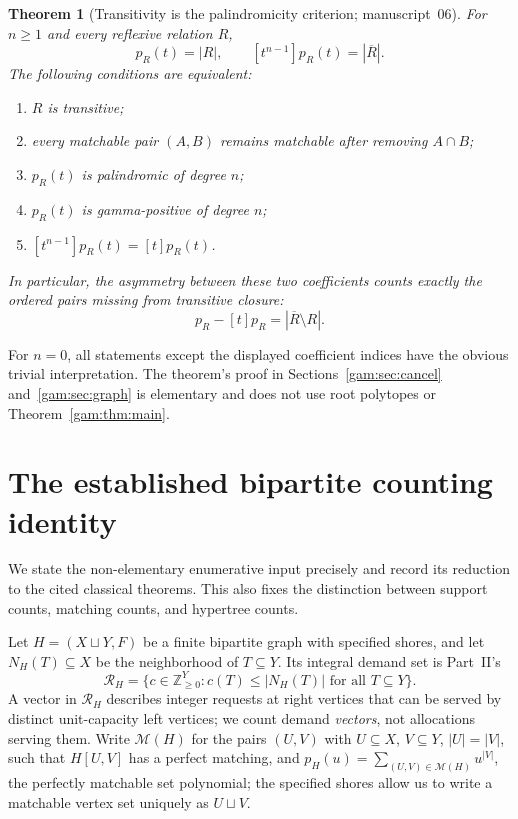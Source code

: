 \documentclass[11pt]{article}
\numberwithin{equation}{section}
\newtheorem{theorem}{Theorem}[section]
\theoremstyle{definition}
\newcommand{\N}{\mathbb Z_{\geq0}}
\begin{document}
\begin{theorem}[Transitivity is the palindromicity criterion; manuscript~06]\label{gam:thm:graphintro}
For $n\ge1$ and every reflexive relation $R$,
\begin{equation}
 [t]p_R(t)=|R|,\qquad [t^{n-1}]p_R(t)=|\overline R|.
 \label{gam:eq:endpoints}
\end{equation}
The following conditions are equivalent:
\begin{enumerate}[label=(\roman*),itemsep=1pt,topsep=3pt]
\item $R$ is transitive;
\item every matchable pair $(A,B)$ remains matchable after removing $A\cap B$;
\item $p_R(t)$ is palindromic of degree $n$;
\item $p_R(t)$ is gamma-positive of degree $n$;
\item $[t^{n-1}]p_R(t)=[t]p_R(t)$.
\end{enumerate}
In particular, the asymmetry between these two coefficients counts exactly
the ordered pairs missing from transitive closure:
\begin{equation}
 [t^{n-1}]p_R-[t]p_R=|\overline R\setminus R|.
 \label{gam:eq:defect}
\end{equation}
\end{theorem}
For $n=0$, all statements except the displayed coefficient indices have the
obvious trivial interpretation. The theorem's proof in
Sections~\ref{gam:sec:cancel} and~\ref{gam:sec:graph} is elementary and does
not use root polytopes or Theorem~\ref{gam:thm:main}.

\section{The established bipartite counting identity}\label{gam:sec:count}
We state the non-elementary enumerative input precisely and record its
reduction to the cited classical theorems. This also fixes the distinction
between support counts, matching counts, and hypertree counts.

Let $H=(X\sqcup Y,F)$ be a finite bipartite graph with specified shores, and
let $N_H(T)\subseteq X$ be the neighborhood of $T\subseteq Y$. Its integral
demand set is Part~II's
\begin{equation}
 \mathcal R_H=\{c\in\N^Y:c(T)\le |N_H(T)|\text{ for all }T\subseteq Y\}.
 \label{gam:eq:demands}
\end{equation}
A vector in $\mathcal R_H$ describes integer requests at right vertices that
can be served by distinct unit-capacity left vertices; we count demand
\emph{vectors}, not allocations serving them. Write $\mathcal M(H)$ for the
pairs $(U,V)$ with $U\subseteq X$, $V\subseteq Y$, $|U|=|V|$, such that
$H[U,V]$ has a perfect matching, and
$p_H(u)=\sum_{(U,V)\in\mathcal M(H)}u^{|V|}$, the perfectly matchable set
polynomial; the specified shores allow us to write a matchable vertex set
uniquely as $U\sqcup V$.
\end{document}
